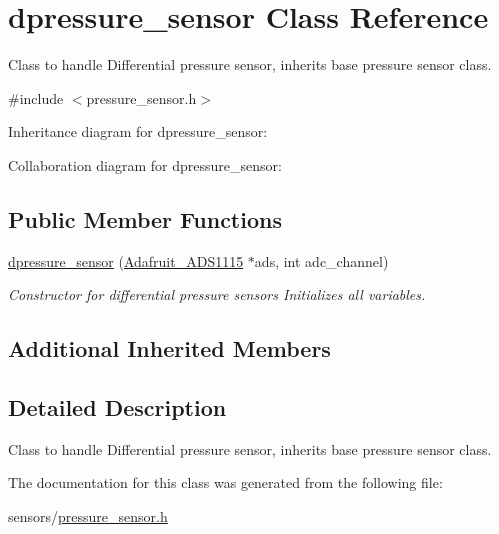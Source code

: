 \hypertarget{classdpressure__sensor}{}\section{dpressure\+\_\+sensor Class Reference}
\label{classdpressure__sensor}


Class to handle Differential pressure sensor, inherits base pressure sensor class.  




{\ttfamily \#include $<$pressure\+\_\+sensor.\+h$>$}



Inheritance diagram for dpressure\+\_\+sensor\+:


Collaboration diagram for dpressure\+\_\+sensor\+:
\subsection*{Public Member Functions}
\begin{DoxyCompactItemize}
\item 
\mbox{\label{classdpressure__sensor_a2bf8974d8573ffab7ecc3f14a42b02d5}} 
\hyperlink{classdpressure__sensor_a2bf8974d8573ffab7ecc3f14a42b02d5}{dpressure\+\_\+sensor} (\hyperlink{class_adafruit___a_d_s1115}{Adafruit\+\_\+\+A\+D\+S1115} $\ast$ads, int adc\+\_\+channel)
\begin{DoxyCompactList}\small\item\em Constructor for differential pressure sensors Initializes all variables. \end{DoxyCompactList}\end{DoxyCompactItemize}
\subsection*{Additional Inherited Members}


\subsection{Detailed Description}
Class to handle Differential pressure sensor, inherits base pressure sensor class. 

The documentation for this class was generated from the following file\+:\begin{DoxyCompactItemize}
\item 
sensors/\hyperlink{pressure__sensor_8h}{pressure\+\_\+sensor.\+h}\end{DoxyCompactItemize}
